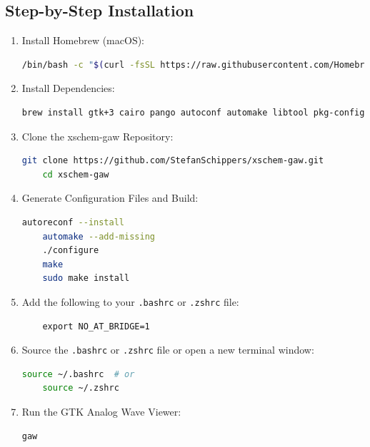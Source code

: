 \documentclass[12pt]{article}
\begin{document}
\subsection{Step-by-Step Installation}
\begin{enumerate}
    \item Install Homebrew (macOS):
    \begin{lstlisting}[language=bash, breaklines=true]
    /bin/bash -c "$(curl -fsSL https://raw.githubusercontent.com/Homebrew/install/HEAD/install.sh)"
    \end{lstlisting}
    
    \item Install Dependencies:
    \begin{lstlisting}[language=bash, breaklines=true]
    brew install gtk+3 cairo pango autoconf automake libtool pkg-config at-spi2-core
    \end{lstlisting}

    \item Clone the xschem-gaw Repository:
    \begin{lstlisting}[language=bash, breaklines=true]
    git clone https://github.com/StefanSchippers/xschem-gaw.git
    cd xschem-gaw
    \end{lstlisting}

    \item Generate Configuration Files and Build:
    \begin{lstlisting}[language=bash, breaklines=true]
    autoreconf --install
    automake --add-missing
    ./configure
    make
    sudo make install
    \end{lstlisting}

    \item Add the following to your \texttt{.bashrc} or \texttt{.zshrc} file:
    \begin{lstlisting}
    export NO_AT_BRIDGE=1
    \end{lstlisting}

    \item Source the \texttt{.bashrc} or \texttt{.zshrc} file or open a new terminal window:
    \begin{lstlisting}[language=bash]
    source ~/.bashrc  # or
    source ~/.zshrc
    \end{lstlisting}

    \item Run the GTK Analog Wave Viewer:
    \begin{lstlisting}[language=bash]
    gaw
    \end{lstlisting}
\end{enumerate}
\end{document}
